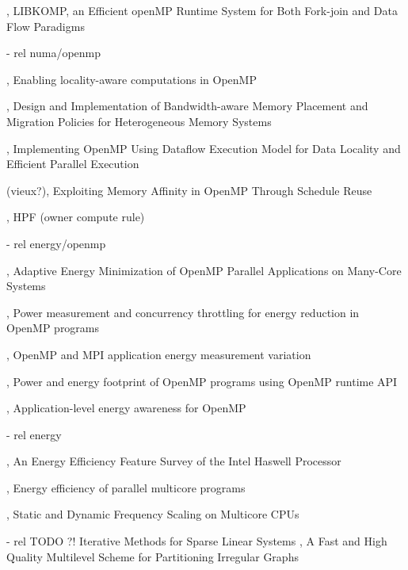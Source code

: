 \cite{Broquedis2012}, LIBKOMP, an Efficient openMP Runtime System for Both Fork-join and Data Flow Paradigms

  - rel numa/openmp

\cite{Huang2010}, Enabling locality-aware computations in OpenMP

\cite{Yu2017}, Design and Implementation of Bandwidth-aware Memory Placement and Migration Policies for Heterogeneous Memory Systems

\cite{Weng2002}, Implementing OpenMP Using Dataflow Execution Model for Data Locality and Efficient Parallel Execution

(vieux?)\cite{Nikolopoulos2001}, Exploiting Memory Affinity in OpenMP Through Schedule Reuse

\cite{HPF}, HPF (owner compute rule)

  - rel energy/openmp

\cite{Shafik2015}, Adaptive Energy Minimization of OpenMP Parallel Applications on Many-Core Systems

\cite{Porterfield2013}, Power measurement and concurrency throttling for energy reduction in OpenMP programs

\cite{Porterfield2013a}, OpenMP and MPI application energy measurement variation

\cite{Nandamuri2015}, Power and energy footprint of OpenMP programs using OpenMP runtime API

\cite{Alessi2015}, Application-level energy awareness for OpenMP

  - rel energy

\cite{Hackenberg2015}, An Energy Efficiency Feature Survey of the Intel Haswell Processor

\cite{Davidovic2015}, Energy efficiency of parallel multicore programs

\cite{Bao2016}, Static and Dynamic Frequency Scaling on Multicore CPUs

 - rel TODO ?!
\cite{Saad2013} Iterative Methods for Sparse Linear Systems
\cite{Karypis1998}, A Fast and High Quality Multilevel Scheme for Partitioning Irregular Graphs





